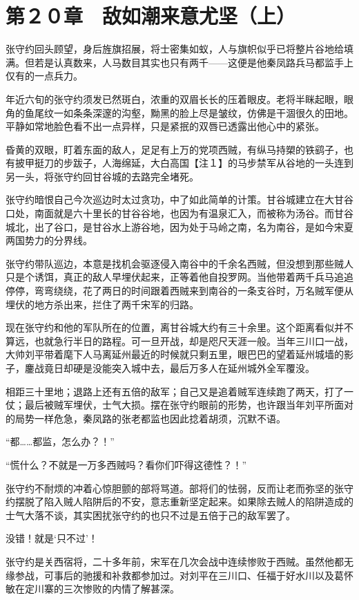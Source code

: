 \section{第２０章　敌如潮来意尤坚（上）}

张守约回头顾望，身后旌旗招展，将士密集如蚁，人与旗帜似乎已将整片谷地给填满。但若是认真数来，人马数目其实也只有两千——这便是他秦凤路兵马都监手上仅有的一点兵力。

年近六旬的张守约须发已然斑白，浓重的双眉长长的压着眼皮。老将半眯起眼，眼角的鱼尾纹一如条条深邃的沟壑，黝黑的脸上尽是皱纹，仿佛是干涸很久的田地。平静如常地脸色看不出一点异样，只是紧抿的双唇已透露出他心中的紧张。

昏黄的双眼，盯着东面的敌人，足足有上万的党项西贼，有纵马持槊的铁鹞子，也有披甲挺刀的步跋子，人海绵延，大白高国【注１】的马步禁军从谷地的一头连到另一头，将张守约回甘谷城的去路完全堵死。

张守约暗恨自己今次巡边时太过贪功，中了如此简单的计策。甘谷城建立在大甘谷口处，南面就是六十里长的甘谷谷地，也因为有温泉汇入，而被称为汤谷。而甘谷城北，出了谷口，是甘谷水上游谷地，因为处于马岭之南，名为南谷，是如今宋夏两国势力的分界线。

张守约带队巡边，本意是找机会驱逐侵入南谷中的千余名西贼，但没想到那些贼人只是个诱饵，真正的敌人早埋伏起来，正等着他自投罗网。当他带着两千兵马追追停停，弯弯绕绕，花了两日的时间跟着西贼来到南谷的一条支谷时，万名贼军便从埋伏的地方杀出来，拦住了两千宋军的归路。

现在张守约和他的军队所在的位置，离甘谷城大约有三十余里。这个距离看似并不算远，也就急行半日的路程。可一旦开战，却是咫尺天涯一般。当年三川口一战，大帅刘平带着麾下人马离延州最近的时候就只剩五里，眼巴巴的望着延州城墙的影子，鏖战竟日却硬是没能突入城中去，最后万多人在延州城外全军覆没。

相距三十里地；退路上还有五倍的敌军；自己又是追着贼军连续跑了两天，打了一仗；最后被贼军埋伏，士气大损。摆在张守约眼前的形势，也许跟当年刘平所面对的局势一样危急，秦凤路的张老都监也因此捻着胡须，沉默不语。

“都……都监，怎么办？！”

“慌什么？不就是一万多西贼吗？看你们吓得这德性？！”

张守约不耐烦的冲着心惊胆颤的部将骂道。部将们的怯弱，反而让老而弥坚的张守约摆脱了陷入贼人陷阱后的不安，意志重新坚定起来。如果除去贼人的陷阱造成的士气大落不谈，其实困扰张守约的也只不过是五倍于己的敌军罢了。

没错！就是‘只不过’！

张守约是关西宿将，二十多年前，宋军在几次会战中连续惨败于西贼。虽然他都无缘参战，可事后的驰援和补救都参加过。对刘平在三川口、任福于好水川以及葛怀敏在定川寨的三次惨败的内情了解甚深。

